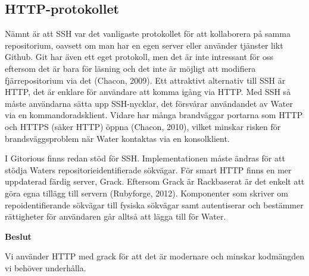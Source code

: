 \subsection{HTTP-protokollet}
Nämnt är att SSH var det vanligaste protokollet för att kollaborera på samma
repositorium, oavsett om man har en egen server eller använder tjänster likt
Github. Git har även ett eget protokoll, men det är inte intressant för oss
eftersom det är bara för läsning och det inte är möjligt att modifiera
fjärrepositorium via det (Chacon, 2009). Ett attraktivt alternativ till SSH är
HTTP, det är enklare för användare att komma igång via HTTP.  Med SSH så måste
användarna sätta upp SSH-nycklar, det försvårar användandet av Water via en
kommandoradsklient.  Vidare har många brandväggar portarna som HTTP och HTTPS
(säker HTTP) öppna (Chacon, 2010), vilket minskar risken för brandsväggsproblem
när Water kontaktas via en konsolklient.

I Gitorious finns redan stöd för SSH. Implementationen måste ändras för att
stödja Waters repositorieidentifierade sökvägar. För smart HTTP finns en mer
uppdaterad färdig server, Grack.  Eftersom Grack är Rackbaserat är det enkelt
att göra egna tillägg till servern (Rubyforge, 2012). Komponenter som skriver
om repoidentifierande sökvägar till fysiska sökvägar samt autentiserar och
bestämmer rättigheter för användaren går alltså att lägga till för Water.

\begin{flushright}
  
  \textbf{Beslut}
  
  Vi använder HTTP med grack för att det är modernare och minskar kodmängden vi behöver underhålla.
  
\end{flushright}
